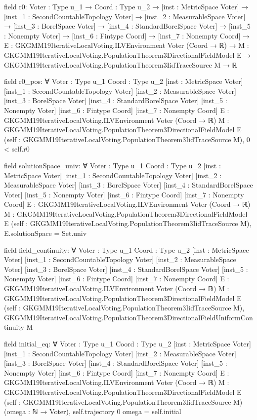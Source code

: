 \documentclass[10pt]{article}
\begin{document}
\begin{ReviewVerbatim}
field r0:
{Voter : Type u_1} →
  {Coord : Type u_2} →
    [inst : MetricSpace Voter] →
      [inst_1 : SecondCountableTopology Voter] →
        [inst_2 : MeasurableSpace Voter] →
          [inst_3 : BorelSpace Voter] →
            [inst_4 : StandardBorelSpace Voter] →
              [inst_5 : Nonempty Voter] →
                [inst_6 : Fintype Coord] →
                  [inst_7 : Nonempty Coord] →
                    {E : GKGMM19IterativeLocalVoting.ILVEnvironment Voter (Coord → ℝ)} →
                      {M : GKGMM19IterativeLocalVoting.PopulationTheorem3DirectionalFieldModel E} →
                        GKGMM19IterativeLocalVoting.PopulationTheorem3IidTraceSource M → ℝ

field r0_pos:
∀ {Voter : Type u_1} {Coord : Type u_2} [inst : MetricSpace Voter] [inst_1 : SecondCountableTopology Voter]
  [inst_2 : MeasurableSpace Voter] [inst_3 : BorelSpace Voter] [inst_4 : StandardBorelSpace Voter]
  [inst_5 : Nonempty Voter] [inst_6 : Fintype Coord] [inst_7 : Nonempty Coord]
  {E : GKGMM19IterativeLocalVoting.ILVEnvironment Voter (Coord → ℝ)}
  {M : GKGMM19IterativeLocalVoting.PopulationTheorem3DirectionalFieldModel E}
  (self : GKGMM19IterativeLocalVoting.PopulationTheorem3IidTraceSource M), 0 < self.r0

field solutionSpace_univ:
∀ {Voter : Type u_1} {Coord : Type u_2} [inst : MetricSpace Voter] [inst_1 : SecondCountableTopology Voter]
  [inst_2 : MeasurableSpace Voter] [inst_3 : BorelSpace Voter] [inst_4 : StandardBorelSpace Voter]
  [inst_5 : Nonempty Voter] [inst_6 : Fintype Coord] [inst_7 : Nonempty Coord]
  {E : GKGMM19IterativeLocalVoting.ILVEnvironment Voter (Coord → ℝ)}
  {M : GKGMM19IterativeLocalVoting.PopulationTheorem3DirectionalFieldModel E}
  (self : GKGMM19IterativeLocalVoting.PopulationTheorem3IidTraceSource M), E.solutionSpace = Set.univ

field field_continuity:
∀ {Voter : Type u_1} {Coord : Type u_2} [inst : MetricSpace Voter] [inst_1 : SecondCountableTopology Voter]
  [inst_2 : MeasurableSpace Voter] [inst_3 : BorelSpace Voter] [inst_4 : StandardBorelSpace Voter]
  [inst_5 : Nonempty Voter] [inst_6 : Fintype Coord] [inst_7 : Nonempty Coord]
  {E : GKGMM19IterativeLocalVoting.ILVEnvironment Voter (Coord → ℝ)}
  {M : GKGMM19IterativeLocalVoting.PopulationTheorem3DirectionalFieldModel E}
  (self : GKGMM19IterativeLocalVoting.PopulationTheorem3IidTraceSource M),
  GKGMM19IterativeLocalVoting.PopulationTheorem3DirectionalFieldUniformContinuity M

field initial_eq:
∀ {Voter : Type u_1} {Coord : Type u_2} [inst : MetricSpace Voter] [inst_1 : SecondCountableTopology Voter]
  [inst_2 : MeasurableSpace Voter] [inst_3 : BorelSpace Voter] [inst_4 : StandardBorelSpace Voter]
  [inst_5 : Nonempty Voter] [inst_6 : Fintype Coord] [inst_7 : Nonempty Coord]
  {E : GKGMM19IterativeLocalVoting.ILVEnvironment Voter (Coord → ℝ)}
  {M : GKGMM19IterativeLocalVoting.PopulationTheorem3DirectionalFieldModel E}
  (self : GKGMM19IterativeLocalVoting.PopulationTheorem3IidTraceSource M) (omega : ℕ → Voter),
  self.trajectory 0 omega = self.initial


\end{ReviewVerbatim}
\end{document}
